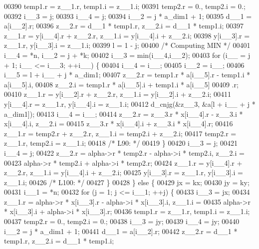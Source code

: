 \begin{DoxyCode}
00390         temp1.r = z\_\_1.r, temp1.i = z\_\_1.i;
00391         temp2.r = 0., temp2.i = 0.;
00392         i\_\_3 = j;
00393         i\_\_4 = j;
00394         i\_\_2 = j * a\_dim1 + 1;
00395         d\_\_1 = a[i\_\_2].r;
00396         z\_\_2.r = d\_\_1 * temp1.r, z\_\_2.i = d\_\_1 * temp1.i;
00397         z\_\_1.r = y[i\_\_4].r + z\_\_2.r, z\_\_1.i = y[i\_\_4].i + z\_\_2.i;
00398         y[i\_\_3].r = z\_\_1.r, y[i\_\_3].i = z\_\_1.i;
00399         l = 1 - j;
00400 \textcolor{comment}{/* Computing MIN */}
00401         i\_\_4 = *n, i\_\_2 = j + *k;
00402         i\_\_3 = min(i\_\_4,i\_\_2);
00403         \textcolor{keywordflow}{for} (i\_\_ = j + 1; i\_\_ <= i\_\_3; ++i\_\_) \{
00404             i\_\_4 = i\_\_;
00405             i\_\_2 = i\_\_;
00406             i\_\_5 = l + i\_\_ + j * a\_dim1;
00407             z\_\_2.r = temp1.r * a[i\_\_5].r - temp1.i * a[i\_\_5].i, 
00408                 z\_\_2.i = temp1.r * a[i\_\_5].i + temp1.i * a[i\_\_5]
00409                 .r;
00410             z\_\_1.r = y[i\_\_2].r + z\_\_2.r, z\_\_1.i = y[i\_\_2].i + z\_\_2.i;
00411             y[i\_\_4].r = z\_\_1.r, y[i\_\_4].i = z\_\_1.i;
00412             d\_cnjg(&z\_\_3, &a[l + i\_\_ + j * a\_dim1]);
00413             i\_\_4 = i\_\_;
00414             z\_\_2.r = z\_\_3.r * x[i\_\_4].r - z\_\_3.i * x[i\_\_4].i, z\_\_2.i =
00415                  z\_\_3.r * x[i\_\_4].i + z\_\_3.i * x[i\_\_4].r;
00416             z\_\_1.r = temp2.r + z\_\_2.r, z\_\_1.i = temp2.i + z\_\_2.i;
00417             temp2.r = z\_\_1.r, temp2.i = z\_\_1.i;
00418 \textcolor{comment}{/* L90: */}
00419         \}
00420         i\_\_3 = j;
00421         i\_\_4 = j;
00422         z\_\_2.r = alpha->r * temp2.r - alpha->i * temp2.i, z\_\_2.i = 
00423             alpha->r * temp2.i + alpha->i * temp2.r;
00424         z\_\_1.r = y[i\_\_4].r + z\_\_2.r, z\_\_1.i = y[i\_\_4].i + z\_\_2.i;
00425         y[i\_\_3].r = z\_\_1.r, y[i\_\_3].i = z\_\_1.i;
00426 \textcolor{comment}{/* L100: */}
00427         \}
00428     \} \textcolor{keywordflow}{else} \{
00429         jx = kx;
00430         jy = ky;
00431         i\_\_1 = *n;
00432         \textcolor{keywordflow}{for} (j = 1; j <= i\_\_1; ++j) \{
00433         i\_\_3 = jx;
00434         z\_\_1.r = alpha->r * x[i\_\_3].r - alpha->i * x[i\_\_3].i, z\_\_1.i =
00435              alpha->r * x[i\_\_3].i + alpha->i * x[i\_\_3].r;
00436         temp1.r = z\_\_1.r, temp1.i = z\_\_1.i;
00437         temp2.r = 0., temp2.i = 0.;
00438         i\_\_3 = jy;
00439         i\_\_4 = jy;
00440         i\_\_2 = j * a\_dim1 + 1;
00441         d\_\_1 = a[i\_\_2].r;
00442         z\_\_2.r = d\_\_1 * temp1.r, z\_\_2.i = d\_\_1 * temp1.i;

\end{DoxyCode}
